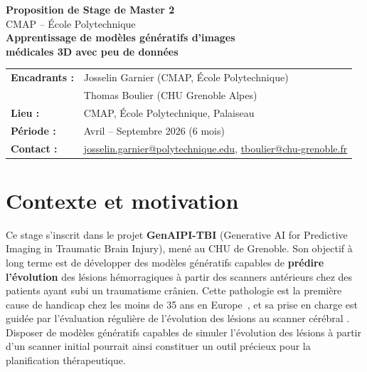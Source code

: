 \documentclass[11pt,a4paper]{article}
\begin{document}
\begin{center}
    {\Large\bfseries\color{polytechnique} Proposition de Stage de Master 2}\\[0.3cm]
    {\large CMAP -- École Polytechnique}\\[0.8cm]

    {\LARGE\bfseries Apprentissage de modèles génératifs d'images\\[0.2cm]
    médicales 3D avec peu de données}\\[1cm]
\end{center}

\noindent
\begin{tabular}{@{}ll}
    \textbf{Encadrants :} & Josselin Garnier (CMAP, École Polytechnique)\\
                          & Thomas Boulier (CHU Grenoble Alpes)\\[0.2cm]
    \textbf{Lieu :}       & CMAP, École Polytechnique, Palaiseau\\[0.2cm]
    \textbf{Période :}    & Avril -- Septembre 2026 (6 mois)\\[0.2cm]
    \textbf{Contact :}    & \href{mailto:josselin.garnier@polytechnique.edu}{josselin.garnier@polytechnique.edu},
                            \href{mailto:tboulier@chu-grenoble.fr}{tboulier@chu-grenoble.fr}\\
\end{tabular}

\vspace{0.6cm}

\section*{Contexte et motivation}

Ce stage s'inscrit dans le projet \textbf{GenAIPI-TBI} (Generative AI for Predictive
Imaging in Traumatic Brain Injury), mené au CHU de Grenoble. Son objectif à long terme est de développer des 
modèles génératifs capables de \textbf{prédire l'évolution} des lésions hémorragiques à partir des scanners 
antérieurs chez des patients ayant subi un traumatisme crânien. Cette pathologie est la première cause de handicap 
chez les moins de 35 ans en Europe~\cite{maas2017tbi}, et sa prise en charge est guidée par l'évaluation
régulière de l'évolution des lésions au scanner cérébral \cite{geeraerts2016sfar}. Disposer de modèles
génératifs capables de simuler l'évolution des lésions à partir d'un scanner initial pourrait ainsi
constituer un outil précieux pour la planification thérapeutique.
\end{document}
